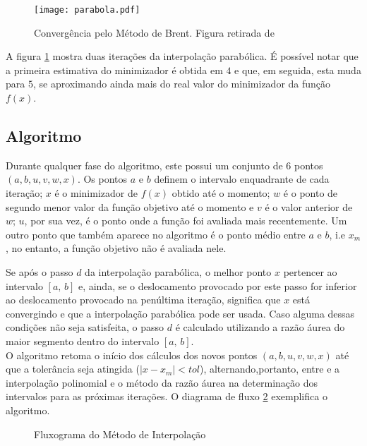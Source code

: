 \begin{figure}[!h]
\centering
    \texttt{[image: parabola.pdf]}
    \caption{Convergência pelo Método de Brent. Figura retirada de \cite{Brent} }
\label{fig:parabolas}
\end{figure}

A figura \ref{fig:parabolas} mostra duas iterações da interpolação parabólica. É possível notar que a primeira estimativa do minimizador é obtida em $4$ e que, em seguida, esta muda para $5$, se aproximando ainda mais do real valor do minimizador da função $f(x)$.
 
\subsection{Algoritmo}

\vspace{0.5cm}

Durante qualquer fase do algoritmo, este possui um conjunto de 6 pontos $(a, b, u, v, w, x)$. Os pontos $a$ e $b$ definem o intervalo enquadrante de cada iteração; $x$ é o minimizador de $f(x)$ obtido até o momento; $w$ é o ponto de segundo menor valor da função objetivo até o momento e $v$ é o valor anterior de $w$; $u$, por sua vez,  é o ponto onde a função foi avaliada mais recentemente. Um outro ponto que também aparece no algoritmo é o ponto médio entre $a$ e $b$, i.e $x_m$, no entanto, a função objetivo não é avaliada nele.

Se após o passo $d$ da interpolação parabólica, o melhor ponto $x$ pertencer ao intervalo $[a, \, b]$ e, ainda, se o deslocamento provocado por este passo for inferior ao deslocamento provocado na penúltima iteração, significa que $x$ está convergindo e que a interpolação parabólica pode ser usada. Caso alguma dessas condições não seja satisfeita, o passo $d$ é calculado utilizando a razão áurea do maior segmento dentro do intervalo $[a, \,b]$.\\

O algoritmo retoma o início dos cálculos dos novos pontos $(a, b, u, v, w, x)$ até que a tolerância seja atingida ($ |x-x_m| < tol $), alternando,portanto, entre e a interpolação polinomial e o método da razão áurea na determinação dos intervalos para as próximas iterações. O diagrama de fluxo \ref{fig:brentFlow} exemplifica o algoritmo.

 \begin{figure}
 \centering
 \scalebox{1}{}
 \caption{Fluxograma do Método de Interpolação}
 \label{fig:brentFlow}
 \end{figure}

